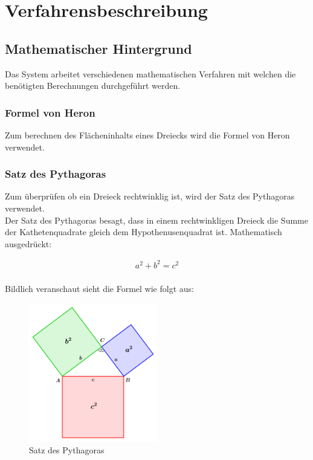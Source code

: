 \chapter{Verfahrensbeschreibung}\label{ch:verfahrensbeschreibung}


\section{Mathematischer Hintergrund}\label{sec:mathematischer_hintergrund}
Das System arbeitet verschiedenen mathematischen Verfahren mit welchen die benötigten Berechnungen durchgeführt werden.

\subsection{Formel von Heron}\label{subsec:formel_von_heron}
Zum berechnen des Flächeninhalts eines Dreiecks wird die Formel von Heron verwendet.

\subsection{Satz des Pythagoras}\label{subsec:satz_des_pythagoras}
Zum überprüfen ob ein Dreieck rechtwinklig ist, wird der Satz des Pythagoras verwendet.
\\
Der Satz des Pythagoras besagt, dass in einem rechtwinkligen Dreieck die Summe der Kathetenquadrate gleich dem Hypothenusenquadrat ist. Mathematisch ausgedrückt:

\begin{align}
    a^2+b^2=c^2\\
\end{align}

Bildlich veranschaut sieht die Formel wie folgt aus:

\begin{figure}
    \centering
    \includegraphics[width=0.5\textwidth]{images/pythagoras.png}
    \caption{Satz des Pythagoras}
    \label{fig:pythagoras}
\end{figure}
